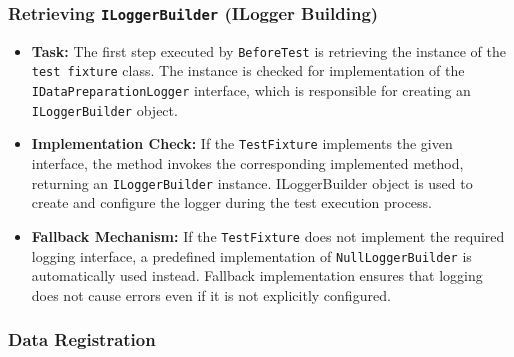 \subsubsection{Retrieving \texttt{ILoggerBuilder} (ILogger Building)} \label{subsubsec:retLogger}

\begin{itemize}
    \item \textbf{Task:}  
    The first step executed by \texttt{BeforeTest} is retrieving the instance of the \texttt{test fixture} class. The instance is checked for implementation of the \texttt{IDataPreparationLogger} interface, which is responsible for creating an \texttt{ILoggerBuilder} object.
    
    \item \textbf{Implementation Check:}  
    If the \texttt{TestFixture} implements the given interface, the method invokes the corresponding implemented method, returning an \texttt{ILoggerBuilder} instance. ILoggerBuilder object is used to create and configure the logger during the test execution process.
    
    \item \textbf{Fallback Mechanism:}  
    If the \texttt{TestFixture} does not implement the required logging interface, a predefined implementation of \texttt{NullLoggerBuilder} is automatically used instead. Fallback implementation ensures that logging does not cause errors even if it is not explicitly configured.
\end{itemize}

\subsubsection{Data Registration}


